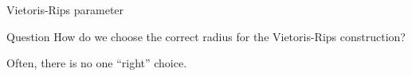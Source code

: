 \documentclass[usenames,dvipsnames,aspectratio=1610]{beamer}
\begin{document}
\begin{frame}{Vietoris-Rips parameter}
  \begin{block}{Question}
  How do we choose the correct radius for the Vietoris-Rips construction?
\end{block}

\pause
Often, there is no one ``right'' choice.
\begin{center}

\end{center}
\end{frame}
\end{document}
